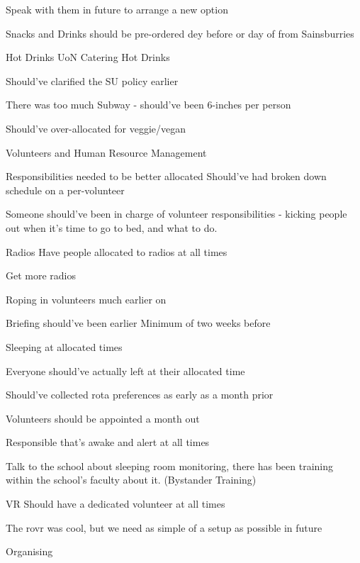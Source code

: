 \documentclass[11pt,hacksoc]{meetingmins}
\begin{document}
\begin{items}
		\subsubitem
		Speak with them in future to arrange a new option
		
	\subitem
	Snacks and Drinks should be pre-ordered dey before or day of from Sainsburries
	
	\subitem
	Hot Drinks
		\subsubitem
		UoN Catering Hot Drinks
		
		\subitem
		Should've clarified the SU policy earlier
		
	\subitem
	There was too much Subway - should've been 6-inches per person
	
		\subsubitem
		Should've over-allocated for veggie/vegan
		
\item
Volunteers and Human Resource Management

	\subitem
	Responsibilities needed to be better allocated
		\subsubitem
		Should've had broken down schedule on a per-volunteer
		
		\subsubitem
		Someone should've been in charge of volunteer responsibilities - kicking people out when it's time to go to bed, and what to do.
		
	\subitem
	Radios
		\subsubitem
		Have people allocated to radios at all times
		
		\subsubitem
		Get more radios
		
		\subsubitem
			Roping in volunteers much earlier on
			
	\subitem
	Briefing should've been earlier
		\subsubitem
		Minimum of two weeks before
		
	\subitem
	Sleeping at allocated times
	
		\subsubitem
		Everyone should've actually left at their allocated time
		
	\subitem
	Should've collected rota preferences as early as a month prior
	
	\subitem
	Volunteers should be appointed a month out
	
	\subitem
	Responsible that's awake and alert at all times
	
	\subitem
	Talk to the school about sleeping room monitoring, there has been training within the school's faculty about it. (Bystander Training)
	
	\subitem
	VR Should have a dedicated volunteer at all times
	
		\subsubitem
		The rovr was cool, but we need as simple of a setup as possible in future
		
\item
Organising


\end{items}
\end{document}

